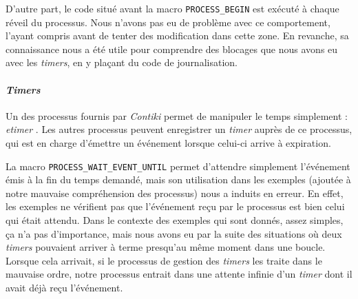 D’autre part, le code situé avant la macro \texttt{PROCESS\_BEGIN} est exécuté à chaque réveil du processus.
Nous n’avons pas eu de problème avec ce comportement, l’ayant compris avant de tenter des modification dans cette zone.
En revanche, sa connaissance nous a été utile pour comprendre des blocages que nous avons eu avec les \emph{timers}, en y plaçant du code de journalisation.

\paragraph{\emph{Timers}}

Un des processus fournis par \emph{Contiki} permet de manipuler le temps simplement : \emph{etimer} .
Les autres processus peuvent enregistrer un \emph{timer} auprès de ce processus, qui est en charge d’émettre un événement lorsque celui-ci arrive à expiration.

La macro \texttt{PROCESS\_WAIT\_EVENT\_UNTIL} permet d’attendre simplement l’événement émis à la fin du temps demandé, mais son utilisation dans les exemples (ajoutée à notre mauvaise compréhension des processus) nous a induits en erreur.
En effet, les exemples ne vérifient pas que l’événement reçu par le processus est bien celui qui était attendu.
Dans le contexte des exemples qui sont donnés, assez simples, ça n’a pas d’importance, mais nous avons eu par la suite des situations où deux \emph{timers} pouvaient arriver à terme presqu’au même moment dans une boucle.
Lorsque cela arrivait, si le processus de gestion des \emph{timers} les traite dans le mauvaise ordre, notre processus entrait dans une attente infinie d’un \emph{timer} dont il avait déjà reçu l’événement.

